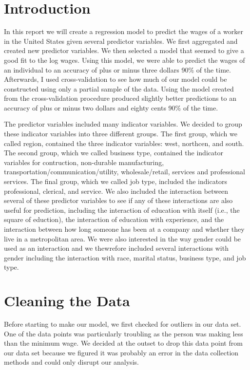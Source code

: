\documentclass[12pt,a4paper,twoside]{article}
\begin{document}
\section{Introduction}
In this report we will create a regression model to predict the wages of a worker in the United States given several predictor variables. We first aggregated and created new predictor variables. We then selected a model that seemed to give a good fit to the log wages. Using this model, we were able to predict the wages of an individual to an accuracy of plus or minus three dollars 90\% of the time. Afterwards, I used cross-validation to see how much of our model could be constructed using only a partial sample of the data. Using the model created from the cross-validation procedure produced slightly better predictions to an accuracy of plus or minus two dollars and eighty cents 90\% of the time. 

The predictor variables included many indicator variables. We decided to group these indicator variables into three different groups. The first group, which we called region, contained the three indicator variables: west, northcen, and south. The second group, which we called business type, contained the indicator variables for contruction, non-durable manufacturing, transportation/communication/utility, wholesale/retail, services and professional services. The final group, which we called job type, included the indicators professional, clerical, and service. We also included the interaction between several of these predictor variables to see if any of these interactions are also useful for prediction, including the interaction of education with itself (i.e., the square of eduction), the interaction of education with experience, and the interaction between how long someone has been at a company and whether they live in a metropolitan area. We were also interested in the way gender could be used as an interaction and we thewrefore included several interactions with gender including the interaction with race, marital status, business type, and job type.
\section{Cleaning the Data}	
Before starting to make our model, we first checked for outliers in our data set. One of the data points was particularly troubling as the person was making less than the minimum wage. We decided at the outset to drop this data point from our data set because we figured it was probably an error in the data collection methods and could only disrupt our analysis.
	
\end{document}
